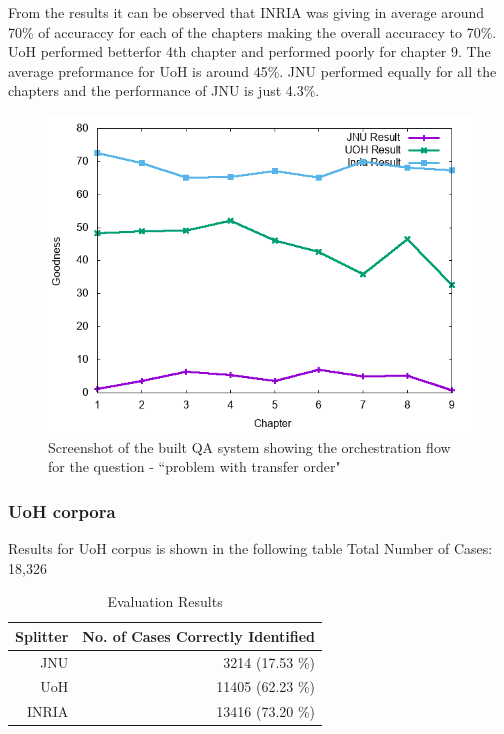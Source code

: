 \documentclass[11pt]{article}
\begin{document}
From the results it can be observed that INRIA was giving in average around 70\% of accuraccy for each of the chapters making the overall accuraccy to 70\%. UoH performed betterfor 4th chapter and performed poorly for chapter 9. The average preformance for UoH is around 45\%. JNU performed equally for all the chapters and the performance of JNU is just 4.3\%. 

\begin{figure}[h]
	\center
	\includegraphics[scale=0.34]{images/split.png}
	\caption{\label{screen}Screenshot of the built QA system showing the orchestration flow for the question - ``problem with transfer order"}
\end{figure}


\subsubsection{UoH corpora}

Results for UoH corpus is shown in the following table
Total Number of Cases: 18,326


\begin{table}[h]
\begin{center}
\begin{tabular}{| r | r | }
\hline  \bf Splitter & \bf No. of Cases Correctly Identified \\
\hline
JNU & 3214 (17.53 \%) \\
UoH & 11405 (62.23 \%) \\
INRIA & 13416 (73.20 \%)\\
\hline
\end{tabular}
\end{center}
\caption{\label{font-table} Evaluation Results }
\end{table}
\end{document}
